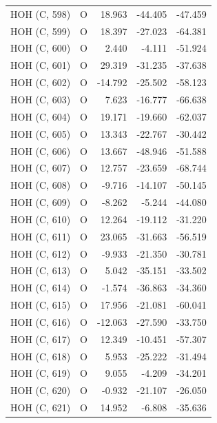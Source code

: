 \begin{longtable}{@{}lcrr@{}}
  \cmidrule(r){1-5}
  HOH (C, 598) & O & 18.963 & -44.405 & -47.459 \\
  \cmidrule(r){1-5}
  HOH (C, 599) & O & 18.397 & -27.023 & -64.381 \\
  \cmidrule(r){1-5}
  HOH (C, 600) & O & 2.440 & -4.111 & -51.924 \\
  \cmidrule(r){1-5}
  HOH (C, 601) & O & 29.319 & -31.235 & -37.638 \\
  \cmidrule(r){1-5}
  HOH (C, 602) & O & -14.792 & -25.502 & -58.123 \\
  \cmidrule(r){1-5}
  HOH (C, 603) & O & 7.623 & -16.777 & -66.638 \\
  \cmidrule(r){1-5}
  HOH (C, 604) & O & 19.171 & -19.660 & -62.037 \\
  \cmidrule(r){1-5}
  HOH (C, 605) & O & 13.343 & -22.767 & -30.442 \\
  \cmidrule(r){1-5}
  HOH (C, 606) & O & 13.667 & -48.946 & -51.588 \\
  \cmidrule(r){1-5}
  HOH (C, 607) & O & 12.757 & -23.659 & -68.744 \\
  \cmidrule(r){1-5}
  HOH (C, 608) & O & -9.716 & -14.107 & -50.145 \\
  \cmidrule(r){1-5}
  HOH (C, 609) & O & -8.262 & -5.244 & -44.080 \\
  \cmidrule(r){1-5}
  HOH (C, 610) & O & 12.264 & -19.112 & -31.220 \\
  \cmidrule(r){1-5}
  HOH (C, 611) & O & 23.065 & -31.663 & -56.519 \\
  \cmidrule(r){1-5}
  HOH (C, 612) & O & -9.933 & -21.350 & -30.781 \\
  \cmidrule(r){1-5}
  HOH (C, 613) & O & 5.042 & -35.151 & -33.502 \\
  \cmidrule(r){1-5}
  HOH (C, 614) & O & -1.574 & -36.863 & -34.360 \\
  \cmidrule(r){1-5}
  HOH (C, 615) & O & 17.956 & -21.081 & -60.041 \\
  \cmidrule(r){1-5}
  HOH (C, 616) & O & -12.063 & -27.590 & -33.750 \\
  \cmidrule(r){1-5}
  HOH (C, 617) & O & 12.349 & -10.451 & -57.307 \\
  \cmidrule(r){1-5}
  HOH (C, 618) & O & 5.953 & -25.222 & -31.494 \\
  \cmidrule(r){1-5}
  HOH (C, 619) & O & 9.055 & -4.209 & -34.201 \\
  \cmidrule(r){1-5}
  HOH (C, 620) & O & -0.932 & -21.107 & -26.050 \\
  \cmidrule(r){1-5}
  HOH (C, 621) & O & 14.952 & -6.808 & -35.636 \\

\end{longtable}

